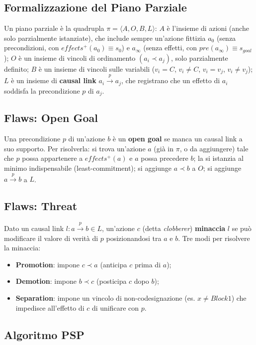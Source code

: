 \documentclass[a4paper,11pt]{article}
\begin{document}
\subsection{Formalizzazione del Piano Parziale}

Un piano parziale è la quadrupla $\pi=\langle A,O,B,L\rangle$: $A$ è l'insieme di azioni (anche solo parzialmente istanziate), che include sempre un'azione fittizia $a_0$ (senza precondizioni, con $effects^+(a_0)\equiv s_0$) e $a_\infty$ (senza effetti, con $pre(a_\infty)\equiv s_{goal}$); $O$ è un insieme di vincoli di ordinamento $(a_i\prec a_j)$, solo parzialmente definito; $B$ è un insieme di vincoli sulle variabili ($v_i{=}C$, $v_i{\neq}C$, $v_i{=}v_j$, $v_i{\neq}v_j$); $L$ è un insieme di \textbf{causal link} $a_i\xrightarrow{p} a_j$, che registrano che un effetto di $a_i$ soddisfa la precondizione $p$ di $a_j$.

\subsection{Flaws: Open Goal}

Una precondizione $p$ di un'azione $b$ è un \textbf{open goal} se manca un causal link a suo supporto. Per risolverla: si trova un'azione $a$ (già in $\pi$, o da aggiungere) tale che $p$ possa appartenere a $effects^+(a)$ e $a$ possa precedere $b$; la si istanzia al minimo indispensabile (least-commitment); si aggiunge $a\prec b$ a $O$; si aggiunge $a\xrightarrow{p} b$ a $L$.

\subsection{Flaws: Threat}

Dato un causal link $l:a\xrightarrow{p}b\in L$, un'azione $c$ (detta \emph{clobberer}) \textbf{minaccia} $l$ se può modificare il valore di verità di $p$ posizionandosi tra $a$ e $b$. Tre modi per risolvere la minaccia:
\begin{itemize}
  \item \textbf{Promotion}: impone $c\prec a$ (anticipa $c$ prima di $a$);
  \item \textbf{Demotion}: impone $b\prec c$ (posticipa $c$ dopo $b$);
  \item \textbf{Separation}: impone un vincolo di non-codesignazione (es. $x\neq Block1$) che impedisce all'effetto di $c$ di unificare con $p$.
\end{itemize}

\subsection{Algoritmo PSP}
\end{document}
